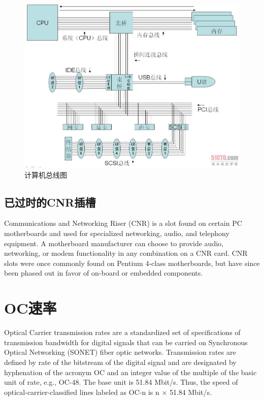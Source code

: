 \begin{figure}[htb]
\centering
\includegraphics[keepaspectratio,width=0.5\paperwidth]{Pictures/g.jpg}
\caption{计算机总线图}
\label{fig:computerbuspic}
\end{figure}


\subsection{已过时的CNR插槽}
Communications and Networking Riser (CNR) is a slot found on certain PC motherboards and used for specialized networking, audio, and telephony equipment. A motherboard manufacturer can choose to provide audio, networking, or modem functionality in any combination on a CNR card. CNR slots were once commonly found on Pentium 4-class motherboards, but have since been phased out in favor of on-board or embedded components.














\section{OC速率}
Optical Carrier transmission rates are a standardized set of specifications of transmission bandwidth for digital signals that can be carried on Synchronous Optical Networking (SONET) fiber optic networks. Transmission rates are defined by rate of the bitstream of the digital signal and are designated by hyphenation of the acronym OC and an integer value of the multiple of the basic unit of rate, e.g., OC-48. The base unit is 51.84 Mbit/s. Thus, the speed of optical-carrier-classified lines labeled as OC-n is n × 51.84 Mbit/s.


